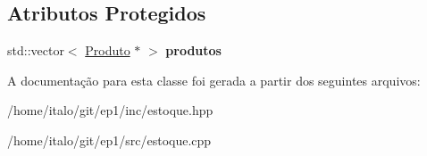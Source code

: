 \subsection*{Atributos Protegidos}
\begin{DoxyCompactItemize}
\item 
\mbox{\label{class_estoque_a2ca8341c75a2c2c0a6750491eea35809}} 
std\+::vector$<$ \hyperlink{class_produto}{Produto} $\ast$ $>$ {\bfseries produtos}
\end{DoxyCompactItemize}


A documentação para esta classe foi gerada a partir dos seguintes arquivos\+:\begin{DoxyCompactItemize}
\item 
/home/italo/git/ep1/inc/estoque.\+hpp\item 
/home/italo/git/ep1/src/estoque.\+cpp\end{DoxyCompactItemize}

